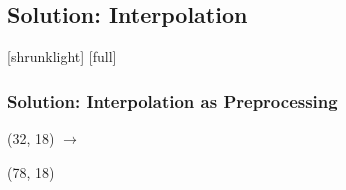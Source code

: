 \documentclass[11pt,compress,aspectratio=169]{beamer} %
\begin{document}
\subsection{Solution: Interpolation} 
[shrunklight]
[full]
\begin{frame}[t]
	\frametitle{Solution: Interpolation as Preprocessing} 
	\begin{textblock}{50}(32, 18)
		\centering
		$\bm{\rightarrow}$
	\end{textblock}
	\begin{textblock}{50}(78, 18)
		\centering
		\only<2>{$\bm{\rightarrow}$}
	\end{textblock}
	

\end{frame}
\end{document}

